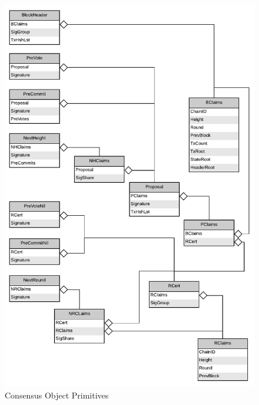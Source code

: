 \begin{figure}[H]
    \centering
    \includegraphics[scale=0.5]{figures/Consensus_Object_Primitive.pdf}
    \caption{Consensus Object Primitives}
\end{figure}

